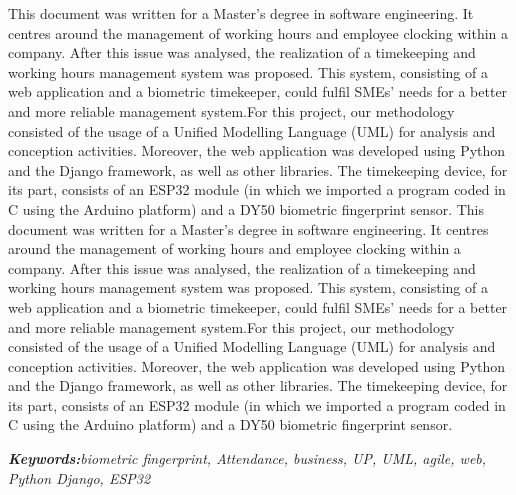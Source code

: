 \begin{titlepage}
This document was written for a Master’s degree in software engineering. It centres around the management of working hours and employee clocking within a company. After this issue was analysed, the realization of a timekeeping and working hours management system was proposed. This system, consisting of a web application and a biometric timekeeper, could fulfil SMEs’ needs for a better and more reliable management system.For this project, our methodology consisted of the usage of a Unified Modelling Language (UML) for analysis and conception activities. Moreover, the web application was developed using Python and the Django framework, as well as other libraries. The timekeeping device, for its part, consists of an ESP32 module (in which we imported a program coded in C using the Arduino platform) and a DY50 biometric fingerprint sensor. 
This document was written for a Master’s degree in software engineering. It centres around the management of working hours and employee clocking within a company. After this issue was analysed, the realization of a timekeeping and working hours management system was proposed. This system, consisting of a web application and a biometric timekeeper, could fulfil SMEs’ needs for a better and more reliable management system.For this project, our methodology consisted of the usage of a Unified Modelling Language (UML) for analysis and conception activities. Moreover, the web application was developed using Python and the Django framework, as well as other libraries. The timekeeping device, for its part, consists of an ESP32 module (in which we imported a program coded in C using the Arduino platform) and a DY50 biometric fingerprint sensor.

\emph{\textbf{Keywords:}biometric fingerprint, Attendance, business, UP, UML, agile, web, Python Django, ESP32}

\end{titlepage}